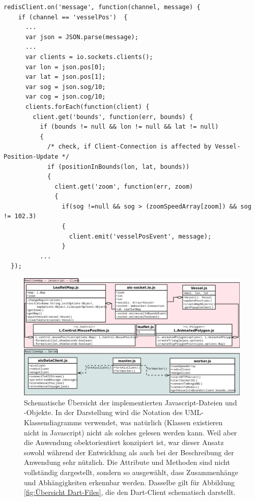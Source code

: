 \begin{lstlisting}[caption= Weiterleitung von Positions-Updates an Websocket-Clients in worker.js, label= Weiterleitung von Positions-Updates an Websocket-Clients in worker.js]
 redisClient.on('message', function(channel, message) {
    if (channel == 'vesselPos')  {
      ...
      var json = JSON.parse(message);
      ...
      var clients = io.sockets.clients();
      var lon = json.pos[0];
      var lat = json.pos[1];
      var sog = json.sog/10;
      var cog = json.cog/10;
      clients.forEach(function(client) {
        client.get('bounds', function(err, bounds) {
          if (bounds != null && lon != null && lat != null) 
          {
            /* check, if Client-Connection is affected by Vessel-Position-Update */
            if (positionInBounds(lon, lat, bounds)) 
            {
              client.get('zoom', function(err, zoom) 
              {
                if(sog !=null && sog > (zoomSpeedArray[zoom]) && sog != 102.3)
                {
                  client.emit('vesselPosEvent', message);
                }
          ...
  });
\end{lstlisting}
\begin{figure}[H]
  \centering
  \includegraphics[width=6in]{images/Javascript-Dateien-undObjekte.png}
  \caption[Übersicht Javascript-Files]{Schematische Übersicht der implementierten Javascript-Dateien und -Objekte. In der Darstellung wird die Notation des UML-Klassendiagramms verwendet, was natürlich (Klassen existieren nicht in Javascript) nicht als solches gelesen werden kann. Weil aber die Anwendung obektorientiert konzipiert ist, war dieser Ansatz sowohl während der Entwicklung als auch bei der Beschreibung der Anwendung sehr nützlich. Die Attribute und Methoden sind nicht vollständig dargestellt, sondern so ausgewählt, dass Zusammenhänge und Abhängigkeiten erkennbar werden.
Dasselbe gilt für Abbildung  \ref{fig:Übersicht Dart-Files}, die den Dart-Client schematisch darstellt. }
  \label{fig:Übersicht Javascript-Files}
\end{figure}
